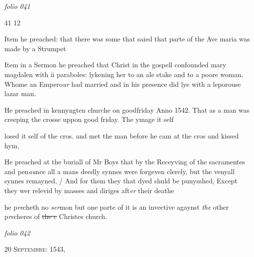 \documentclass[12pt, a4paper]{book}
\begin{document}
\dotfill
					

\textit{folio 041}


\begin{flushright}{\color{Mahogany}41} 12\end{flushright}
 
		\ifthenelse{\isodd{\thepage}}
		{\reversemarginpar}
		{\normalmarginpar}
		Item he preached: that there was some that saied
 that parte of the Ave maria was made by
 a Strumpet
	
		\ifthenelse{\isodd{\thepage}}
		{\reversemarginpar}
		{\normalmarginpar}
		Item in a Sermon he preached that Christ
 in the gospell confounded mary magdalen with
 ii paraboles: lykening her to an ale stake
 and to a poore woman. Whome an Empero\textit{ur}
 had married and in his presence did lye
 with a leporouse lazar man.
	
				\marginpar[\vspace{0.5cm}{\textcolor{Gray}{n}}]{}
			
		\ifthenelse{\isodd{\thepage}}
		{\reversemarginpar}
		{\normalmarginpar}
		He preached in kennyngten churche on goodfriday
 Anno 1542. That as a man was creeping
 the crosse uppon good friday. The ymage it self
			
 losed it self of the cros. and met the man before
 he cam at the cros and kissed hym,
	
		\ifthenelse{\isodd{\thepage}}
		{\reversemarginpar}
		{\normalmarginpar}
		He preached at the buriall of Mr Boys that
 by the Receyving of the sacramentes and pen\textit{au}nce
 all a mans deedly synnes were forgeven clerely,
 but the venyall synnes remayned, / And for them
 they that dyed shuld be punysshed, Except
 they wer relevid by masses and diriges aft\textit{er}
 their deathe
	
		\ifthenelse{\isodd{\thepage}}
		{\reversemarginpar}
		{\normalmarginpar}
		he p\textit{re}cheth no \textit{ser}mon but one parte of it is an invective
 agaynst \textit{the} other p\textit{re}cheres of \sout{the c} Christes church.


            
\dotfill
					

\textit{folio 042}


            
               
				\begin{center} \begin{large} {\scshape 
                  20 Septembre: 1543,
               } \end{large} \end{center}
			
\end{document}
